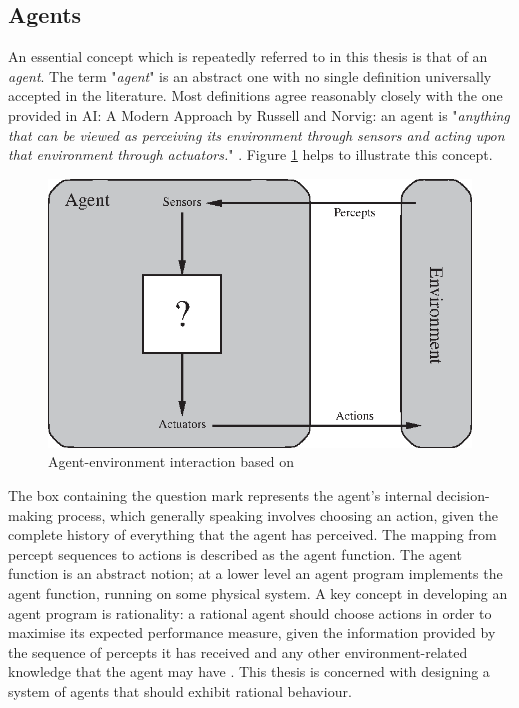 
\subsection{Agents} \label{AgencySubsection}
An essential concept which is repeatedly referred to in this thesis is that of an \emph{agent}. The term "\textit{agent}" is an abstract one with no single definition universally accepted in the literature. Most definitions agree reasonably closely with the one provided in AI: A Modern Approach by Russell and Norvig: an agent is "\textit{anything that can be viewed as perceiving its environment through sensors and acting upon that environment through actuators.}" \cite[p.~34]{AIAMA}. Figure \ref{fig:agent_env_interaction} helps to illustrate this concept. 
\begin{figure}[h]
    \centering
    \includegraphics[width=12cm]{Chapters/BackgroundKnowledgeAndRelatedWork/Figs/Vector/agent-environment.eps}
    \caption{Agent-environment interaction based on \cite[p.~35]{AIAMA}}
    \label{fig:agent_env_interaction}
\end{figure}
The box containing the question mark represents the agent's internal decision-making process, which generally speaking involves choosing an action, given the complete history of everything that the agent has perceived. The mapping from percept sequences to actions is described as the agent function. The agent function is an abstract notion; at a lower level an agent program implements the agent function, running on some physical system. A key concept in developing an agent program is rationality: a rational agent should choose actions in order to maximise its expected performance measure, given the information provided by the sequence of percepts it has received and any other environment-related knowledge that the agent may have \cite[p.~37]{AIAMA}.
This thesis is concerned with designing a system of agents that should exhibit rational behaviour.\newline
 
